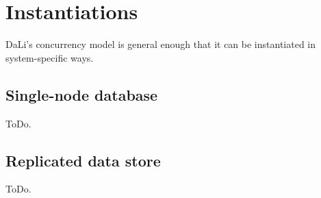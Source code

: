 \section{Instantiations}

DaLi's concurrency model is general enough that it can be instantiated
in system-specific ways. 

\subsection{Single-node database}

ToDo.

\subsection{Replicated data store}

ToDo.
